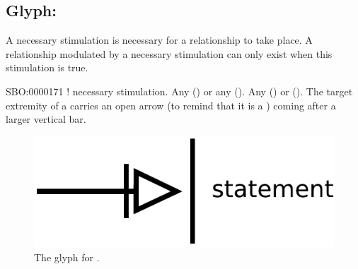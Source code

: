 \color{green}

\subsection{Glyph: }\label{sec:necessaryStimulation}

A necessary stimulation is necessary for a relationship to take place. A relationship modulated by a necessary stimulation can only exist when this stimulation is true.

\begin{glyphDescription}
 \glyphSboTerm SBO:0000171 ! necessary stimulation.
 \glyphOrigin Any  () or any  ().
 \glyphTarget Any  () or  ().
 \glyphEndPoint The target extremity of a  carries an open arrow (to remind that it is a ) coming after a larger vertical bar.
 \end{glyphDescription}

\begin{figure}[H]
  \centering
  \includegraphics[scale = 0.5]{images/necessaryStimulation}
  \caption{The \PD glyph for .}
  \label{fig:necessaryStimulatio}
\end{figure}

